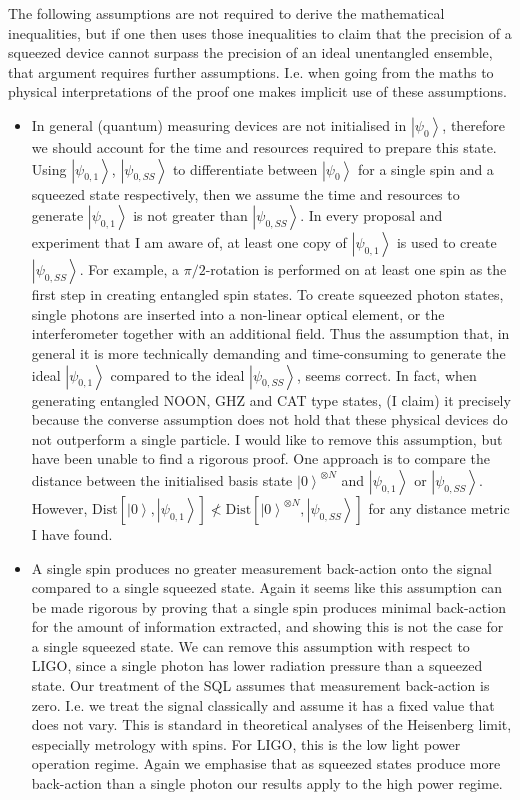 \documentclass[reqno]{amsart}
\newcommand{\ket}[1]{\left| #1 \right>}
\def\func#1#2{\mathrm{#1}\left[#2\right]}
\begin{document}
The following assumptions are not required to derive the mathematical inequalities, but if one then uses those inequalities to claim that the precision of a squeezed device cannot surpass the precision of an ideal unentangled ensemble, that argument requires further assumptions. I.e. when going from the maths to physical interpretations of the proof one makes implicit use of these assumptions. 
\begin{itemize}
\item In general (quantum) measuring devices are not initialised in $\ket{\psi_0}$, therefore we should account for the time and resources required to prepare this state. Using $\ket{\psi_{0,1}}$, $\ket{\psi_{0,SS}}$ to differentiate between $\ket{\psi_0}$ for a single spin and a squeezed state respectively, then we assume the time and resources to generate $\ket{\psi_{0,1}}$ is not greater than $\ket{\psi_{0,SS}}$. In every proposal and experiment that I am aware of, at least one copy of $\ket{\psi_{0,1}}$ is used to create $\ket{\psi_{0,SS}}$. For example, a $\pi/2$-rotation is performed on at least one spin as the first step in creating entangled spin states. To create squeezed photon states, single photons are inserted into a non-linear optical element, or the interferometer together with an additional field. Thus the assumption that, in general it is more technically demanding and time-consuming to generate the ideal $\ket{\psi_{0,1}}$ compared to the ideal $\ket{\psi_{0,SS}}$, seems correct. In fact, when generating entangled NOON, GHZ and CAT type states, (I claim) it precisely because the converse assumption does not hold that these physical devices do not outperform a single particle. I would like to remove this assumption, but have been unable to find a rigorous proof. One approach is to compare the distance between the initialised basis state $\ket{0}^{\otimes N}$ and $\ket{\psi_{0,1}}$ or $\ket{\psi_{0,SS}}$. However, $\func{Dist}{\ket{0},\ket{\psi_{0,1}}} \nless \func{Dist}{\ket{0}^{\otimes N},\ket{\psi_{0,SS}}}$ for any distance metric I have found.
\item A single spin produces no greater measurement back-action onto the signal compared to a single squeezed state. Again it seems like this assumption can be made rigorous by proving that a single spin produces minimal back-action for the amount of information extracted, and showing this is not the case for a single squeezed state. We can remove this assumption with respect to LIGO, since a single photon has lower radiation pressure than a squeezed state. Our treatment of the SQL assumes that measurement back-action is zero. I.e. we treat the signal classically and assume it has a fixed value that does not vary. This is standard in theoretical analyses of the Heisenberg limit, especially metrology with spins. For LIGO, this is the low light power operation regime. Again we emphasise that as squeezed states produce more back-action than a single photon our results apply to the high power regime.

\end{itemize}
\end{document}
